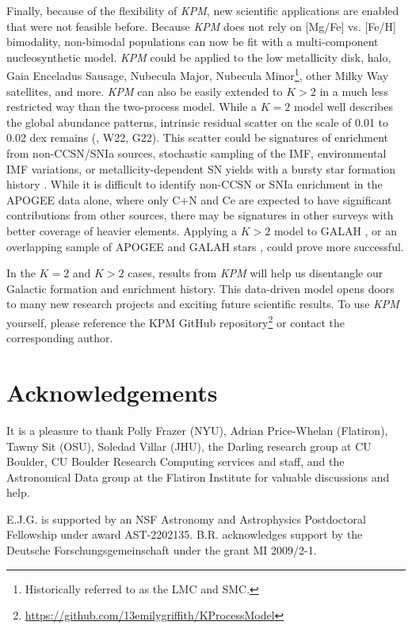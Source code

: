 \documentclass[modern, linenumbers]{aastex631}
\newcommand{\name}{\textsl{KPM}}
\begin{document}
Finally, because of the flexibility of \name{}, new scientific applications are enabled that were not feasible before. Because \name{} does not rely on [Mg/Fe] vs. [Fe/H] bimodality, non-bimodal populations can now be fit with a multi-component nucleosynthetic model. \name{} could be applied to the low metallicity disk, halo, Gaia Enceladus Sausage, Nubecula Major, Nubecula Minor\footnote{Historically referred to as the LMC and SMC.}, other Milky Way satellites, and more. \name{} can also be easily extended to $K>2$ in a much less restricted way than the two-process model. While a $K=2$ model well describes the global abundance patterns, intrinsic residual scatter on the scale of 0.01 to 0.02 dex remains (\citealp{ting2022}, W22, G22). This scatter could be signatures of enrichment from non-CCSN/SNIa sources, stochastic sampling of the IMF, environmental IMF variations, or metallicity-dependent SN yields with a bursty star formation history \citep[e.g.][]{belokurov2022, griffith2023}. While it is difficult to identify non-CCSN or SNIa enrichment in the APOGEE data alone, where only C+N and Ce are expected to have significant contributions from other sources, there may be signatures in other surveys with better coverage of heavier elements. Applying a $K>2$ model to GALAH \citep{buder2021}, or an overlapping sample of APOGEE and GALAH stars \citep{nandakumar2022}, could prove more successful. 

In the $K=2$ and $K>2$ cases, results from \name{} will help us disentangle our Galactic formation and enrichment history. This data-driven model opens doors to many new research projects and exciting future scientific results. To use \name{} yourself, please reference the KPM GitHub repository\footnote{\url{https://github.com/13emilygriffith/KProcessModel}} or contact the corresponding author. 


\section{Acknowledgements}
It is a pleasure to thank
  Polly Frazer (NYU),
  Adrian Price-Whelan (Flatiron),
  Tawny Sit (OSU),
  Soledad Villar (JHU),
  the Darling research group at CU Boulder,
  CU Boulder Research Computing services and staff,
  and the Astronomical Data group at the Flatiron Institute
for valuable discussions and help.

E.J.G. is supported by an NSF Astronomy and Astrophysics Postdoctoral Fellowship under award AST-2202135.
B.R. acknowledges support by the Deutsche Forschungsgemeinschaft under the 
grant MI 2009/2-1.
\end{document}
